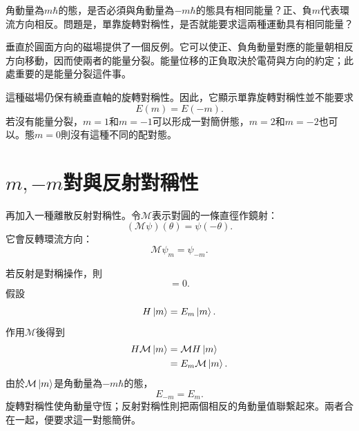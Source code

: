 角動量為\(m\hbar\)的態，是否必須與角動量為\(-m\hbar\)的態具有相同能量？正、負\(m\)代表環流方向相反。問題是，單靠旋轉對稱性，是否就能要求這兩種運動具有相同能量？

\begin{classroomqa}
\end{classroomqa}

垂直於圓面方向的磁場提供了一個反例。它可以使正、負角動量對應的能量朝相反方向移動，因而使兩者的能量分裂。能量位移的正負取決於電荷與方向的約定；此處重要的是能量分裂這件事。

這種磁場仍保有繞垂直軸的旋轉對稱性。因此，它顯示單靠旋轉對稱性並不能要求
\begin{equation}
E(m)=E(-m).
\end{equation}
若沒有能量分裂，\(m=1\)和\(m=-1\)可以形成一對簡併態，\(m=2\)和\(m=-2\)也可以。態\(m=0\)則沒有這種不同的配對態。

\section{\texorpdfstring{\(m,-m\)}{m, -m}對與反射對稱性}

再加入一種離散反射對稱性。令\(\mathcal M\)表示對圓的一條直徑作鏡射：
\begin{equation}
(\mathcal M\psi)(\theta)=\psi(-\theta).
\end{equation}
它會反轉環流方向：
\begin{equation}
\mathcal M\psi_m=\psi_{-m}.
\end{equation}

若反射是對稱操作，則
\begin{equation}
[\mathcal M,H]=0.
\end{equation}
假設
\begin{equation}
H\left\lvert m\right\rangle=E_m\left\lvert m\right\rangle.
\end{equation}
作用\(\mathcal M\)後得到
\begin{align}
H\mathcal M\left\lvert m\right\rangle
&=\mathcal M H\left\lvert m\right\rangle\\
&=E_m\mathcal M\left\lvert m\right\rangle.
\end{align}
由於\(\mathcal M\left\lvert m\right\rangle\)是角動量為\(-m\hbar\)的態，
\begin{equation}
E_{-m}=E_m.
\end{equation}
旋轉對稱性使角動量守恆；反射對稱性則把兩個相反的角動量值聯繫起來。兩者合在一起，便要求這一對態簡併。

